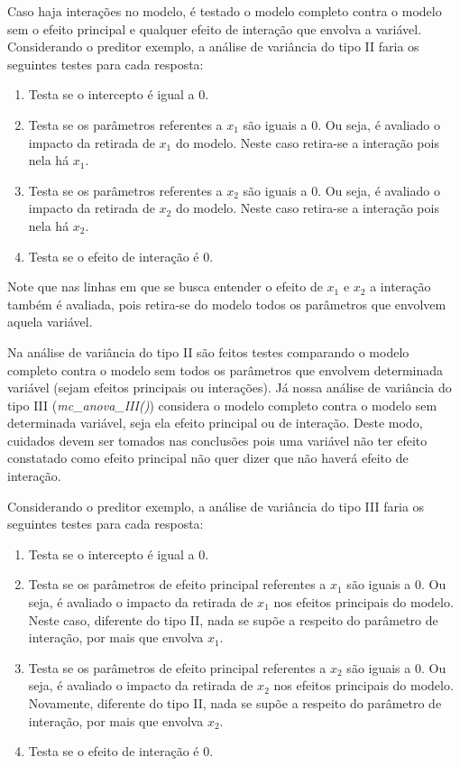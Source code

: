 Caso haja interações no modelo, é testado o modelo completo contra o modelo sem o efeito principal e qualquer efeito de interação que envolva a variável. Considerando o preditor exemplo, a análise de variância do tipo II faria os seguintes testes para cada resposta:

\begin{enumerate}
  \item Testa se o intercepto é igual a 0.
  
  \item Testa se os parâmetros referentes a $x_1$ são iguais a 0. Ou seja, é avaliado o impacto da retirada de $x_1$ do modelo. Neste caso retira-se a interação pois nela há $x_1$.
  
  \item Testa se os parâmetros referentes a $x_2$ são iguais a 0. Ou seja, é avaliado o impacto da retirada de $x_2$ do modelo. Neste caso retira-se a interação pois nela há $x_2$.
  
  \item Testa se o efeito de interação é 0.

\end{enumerate}

Note que nas linhas em que se busca entender o efeito de $x_1$ e $x_2$ a interação também é avaliada, pois retira-se do modelo todos os parâmetros que envolvem aquela variável.

Na análise de variância do tipo II são feitos testes comparando o modelo completo contra o modelo sem todos os parâmetros que envolvem determinada variável (sejam efeitos principais ou interações). Já nossa análise de variância do tipo III (\emph{mc\_anova\_III()}) considera o modelo completo contra o modelo sem determinada variável, seja ela efeito principal ou de interação. Deste modo, cuidados devem ser tomados nas conclusões pois uma variável não ter efeito constatado como efeito principal não quer dizer que não haverá efeito de interação.

Considerando o preditor exemplo, a análise de variância do tipo III faria os seguintes testes para cada resposta:

\begin{enumerate}
  \item Testa se o intercepto é igual a 0.
  
  \item Testa se os parâmetros de efeito principal referentes a $x_1$ são iguais a 0. Ou seja, é avaliado o impacto da retirada de $x_1$ nos efeitos principais do modelo. Neste caso, diferente do tipo II, nada se supõe a respeito do parâmetro de interação, por mais que envolva $x_1$.
  
  \item Testa se os parâmetros de efeito principal referentes a $x_2$ são iguais a 0. Ou seja, é avaliado o impacto da retirada de $x_2$ nos efeitos principais do modelo. Novamente, diferente do tipo II, nada se supõe a respeito do parâmetro de interação, por mais que envolva $x_2$.
  
  \item Testa se o efeito de interação é 0.
\end{enumerate}

